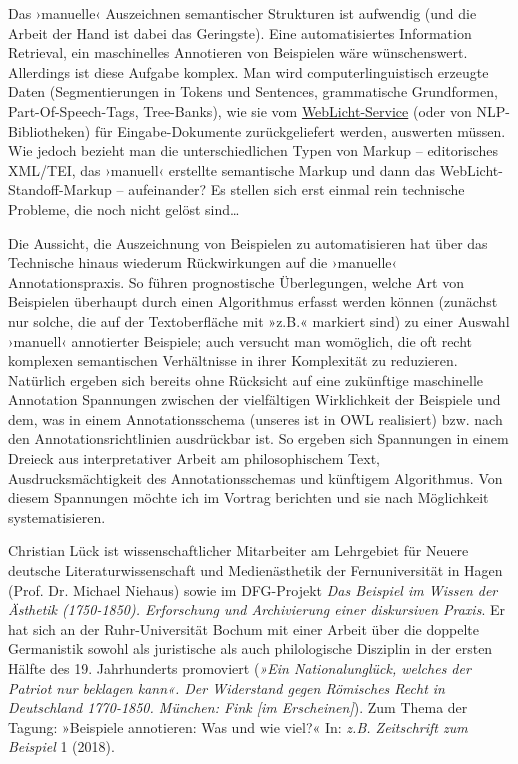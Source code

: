 \documentclass[12pt]{scrartcl}
\begin{document}
Das ›manuelle‹ Auszeichnen semantischer Strukturen ist aufwendig (und
die Arbeit der Hand ist dabei das Geringste). Eine automatisiertes
Information Retrieval, ein maschinelles Annotieren von Beispielen wäre
wünschenswert. Allerdings ist diese Aufgabe komplex. Man wird
computerlinguistisch erzeugte Daten (Segmentierungen in Tokens und
Sentences, grammatische Grundformen, Part-Of-Speech-Tags, Tree-Banks),
wie sie vom
\href{https://weblicht.sfs.uni-tuebingen.de/weblichtwiki/index.php/Main_Page}{WebLicht-Service}
(oder von NLP-Bibliotheken) für Eingabe-Dokumente zurückgeliefert
werden, auswerten müssen. Wie jedoch bezieht man die unterschiedlichen
Typen von Markup -- editorisches XML/TEI, das ›manuell‹ erstellte
semantische Markup und dann das WebLicht-Standoff-Markup --
aufeinander? Es stellen sich erst einmal rein technische Probleme, die
noch nicht gelöst sind…%

Die Aussicht, die Auszeichnung von Beispielen zu automatisieren hat
über das Technische hinaus wiederum Rückwirkungen auf die ›manuelle‹
Annotationspraxis. So führen prognostische Überlegungen, welche Art
von Beispielen überhaupt durch einen Algorithmus erfasst werden können
(zunächst nur solche, die auf der Textoberfläche mit »z.B.« markiert
sind) zu einer Auswahl ›manuell‹ annotierter Beispiele; auch versucht
man womöglich, die oft recht komplexen semantischen Verhältnisse in
ihrer Komplexität zu reduzieren. Natürlich ergeben sich bereits ohne
Rücksicht auf eine zukünftige maschinelle Annotation Spannungen
zwischen der vielfältigen Wirklichkeit der Beispiele und dem, was in
einem Annotationsschema (unseres ist in OWL realisiert) bzw. nach den
Annotationsrichtlinien ausdrückbar ist. So ergeben sich Spannungen in
einem Dreieck aus interpretativer Arbeit am philosophischem Text,
Ausdrucksmächtigkeit des Annotationsschemas und künftigem
Algorithmus. Von diesem Spannungen möchte ich im Vortrag berichten und
sie nach Möglichkeit systematisieren.


\newpage

\newpage
Christian Lück ist wissenschaftlicher Mitarbeiter am Lehrgebiet für
Neuere deutsche Literaturwissenschaft und Medienästhetik der
Fernuniversität in Hagen (Prof. Dr. Michael Niehaus) sowie im
DFG-Projekt \emph{Das Beispiel im Wissen der Ästhetik
  (1750-1850). Erforschung und Archivierung einer diskursiven
  Praxis}. Er hat sich an der Ruhr-Universität Bochum mit einer Arbeit
über die doppelte Germanistik sowohl als juristische als auch
philologische Disziplin in der ersten Hälfte des 19. Jahrhunderts
promoviert (\emph{»Ein Nationalunglück, welches der Patriot nur
  beklagen kann«. Der Widerstand gegen Römisches Recht in Deutschland
  1770-1850. München: Fink [im Erscheinen]}). Zum Thema der Tagung:
»Beispiele annotieren: Was und wie viel?« In: \emph{z.B. Zeitschrift
  zum Beispiel} 1 (2018).
\end{document}

